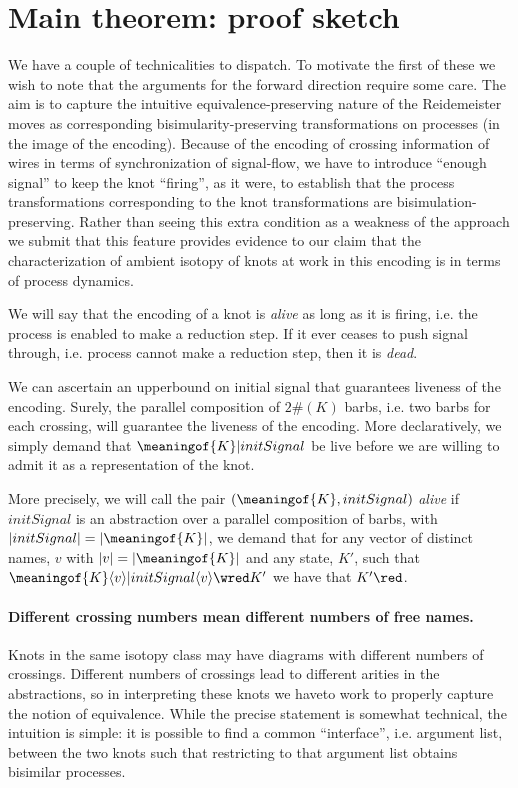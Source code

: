 \section{Main theorem: proof sketch}\label{sub:main_thm_proof_sketch} %

We have a couple of technicalities to dispatch. To motivate the
first of these we wish to note that the arguments for the
forward direction require some care. The aim is to capture the
intuitive equivalence-preserving nature of the Reidemeister moves as
corresponding bisimularity-preserving transformations on processes (in
the image of the encoding). Because of the encoding of crossing
information of wires in terms of synchronization of signal-flow, we
have to introduce ``enough signal'' to keep the knot ``firing'', as it
were, to establish that the process transformations corresponding
to the knot transformations are bisimulation-preserving. Rather than
seeing this extra condition as a weakness of the approach we submit that this feature
provides evidence to our claim that the characterization of ambient isotopy of knots at
work in this encoding is in terms of process dynamics.

We will say that the encoding of a knot is \emph{alive} as long as it
is firing, i.e. the process is enabled to make a reduction step. If it
ever ceases to push signal through, i.e. process cannot make a
reduction step, then it is \emph{dead}.
  
We can ascertain an upperbound on initial signal that guarantees
liveness of the encoding. Surely, the parallel composition of $2\#(K)$
barbs, i.e. two barbs for each crossing, will guarantee the liveness
of the encoding. More declaratively, we simply demand that $
\meaningof{K} | initSignal$ be live before we are willing to admit
it as a representation of the knot.

\begin{definition}
  More precisely, we will call the pair
  $(\meaningof{K},initSignal)$ \emph{alive} if $initSignal$ is
  an abstraction over a parallel composition of barbs, with
  $|initSignal| = |\meaningof{K}|$, we demand that for any vector
  of distinct names, $v$ with $|v| = |\meaningof{K}|$ and any state,
  $K'$, such that $\meaningof{K}\langle v \rangle | initSignal
  \langle v \rangle \wred K'$ we have that $K' \red$.
\end{definition}

\paragraph*{Different crossing numbers mean different numbers of free
  names.}
Knots in the same isotopy class may have diagrams with different numbers of
crossings. Different numbers of crossings lead to different arities
in the abstractions, so in interpreting these knots we haveto work to properly capture the notion of equivalence. While the precise statement
is somewhat technical, the intuition is simple: it is possible to find
a common ``interface'', i.e. argument list, between the two knots such
that restricting to that argument list obtains bisimilar processes.

